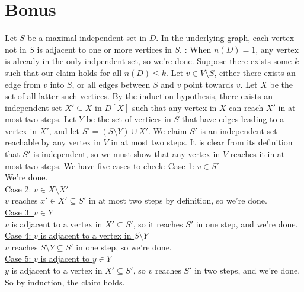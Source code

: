 \documentclass[11pt]{article}
\begin{document}
\section{Bonus} %
Let $S$ be a maximal independent set in $D$. In the underlying graph, each
vertex not in $S$ is adjacent to one or more vertices in $S$.
\newline
\newline
[Induction on $n(D)$]: When $n(D)=1$, any vertex is already in the only
indpendent set, so we're done. Suppose there exists some $k$ such that our
claim holds for all $n(D)\le k$. Let $v\in V\setminus S$, either there exists
an edge from $v$ into $S$, or all edges between $S$ and $v$ point towards $v$.
Let $X$ be the set of all latter such vertices. By the induction hypothesis,
there exists an independent set $X'\subseteq X$ in $D[X]$ such that any vertex
in $X$ can reach $X'$ in at most two steps. Let $Y$ be the set of vertices in
$S$ that have edges leading to a vertex in $X'$, and let
$S'=(S\setminus Y)\cup X'$. We claim $S'$ is an independent set reachable by
any vertex in $V$ in at most two steps. It is clear from its definition that
$S'$ is independent, so we must show that any vertex in $V$ reaches it in at
most two steps. We have five cases to check:
\newline
\newline
\underline{Case 1: $v\in S'$}\\
We're done.\\
\underline{Case 2: $v\in X\setminus X'$}\\
$v$ reaches $x'\in X'\subseteq S'$ in at most two steps by definition, so we're
done.\\
\underline{Case 3: $v\in Y$}\\
$v$ is adjacent to a vertex in $X'\subseteq S'$, so it reaches $S'$ in one
step, and we're done.\\
\underline{Case 4: $v$ is adjacent to a vertex in $S\setminus Y$}\\
$v$ reaches $S\setminus Y\subseteq S'$ in one step, so we're done.\\
\underline{Case 5: $v$ is adjacent to $y\in Y$}\\
$y$ is adjacent to a vertex in $X'\subseteq S'$, so $v$ reaches $S'$ in two
steps, and we're done.
\newline
\newline
So by induction, the claim holds.
\end{document}
